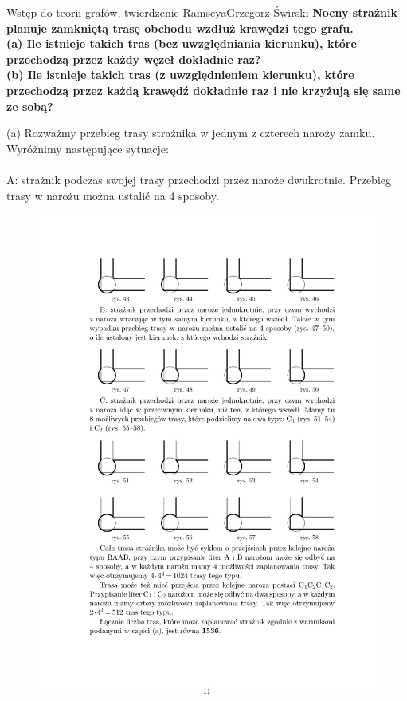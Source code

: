\begin{referat}{Wstęp do teorii grafów, twierdzenie Ramseya}{Grzegorz Świrski}
\textbf{Nocny strażnik planuje zamkniętą trasę obchodu wzdłuż krawędzi tego grafu.\\
(a) Ile istnieje takich tras (bez uwzględniania kierunku), które przechodzą przez każdy węzeł dokładnie raz?\\
(b) Ile istnieje takich tras (z uwzględnieniem kierunku), które przechodzą przez każdą krawędź dokładnie raz i nie krzyżują się same ze sobą?}

(a) Rozważmy przebieg trasy strażnika w jednym z czterech naroży zamku. Wyróżnimy następujące sytuacje:\\
\\
A: strażnik podczas swojej trasy przechodzi przez naroże dwukrotnie. Przebieg trasy w narożu można ustalić na 4 sposoby.

\begin{figure}[!h]
  \begin{flushright}
  \includegraphics[scale=1]{./swirski/ex6a.pdf}
  \end{flushright}
\end{figure}


\end{referat}
